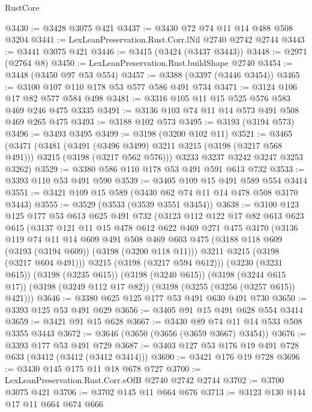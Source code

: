 \begin{lexlean}{RustCore}
\begin{coremodule}
@3430 := @3428 @3075 @421
@3437 := @3430 @72 @74 @11 @14 @488 @508 @3204
@3441 := LexLeanPreservation.Rust.Corr.lNil @2740 @2742 @2744
@3443 := @3441 @3075 @421
@3446 := @3415 (@3424 (@3437 @3443))
@3448 := @2971 (@2764 @8)
@3450 := LexLeanPreservation.Rust.buildShape @2740
@3454 := @3448 (@3450 @97 @53 @554)
@3457 := @3388 (@3397 (@3446 @3454))
@3465 := @3100 @107 @110 @178 @53 @577 @586 @491 @734
@3471 := @3124 @106 @17 @82 @577 @584 @498
@3481 := @3316 @105 @11 @15 @525 @576 @583 @469 @246 @475 @3335
@3491 := @3136 @103 @74 @11 @14 @573 @491 @508 @469 @265 @475
@3493 := @3188 @102 @573
@3495 := @3193 (@3194 @573)
@3496 := @3493 @3495
@3499 := @3198 (@3200 @102 @11)
@3521 := @3465
    (@3471
      (@3481
        (@3491 (@3496 @3499) @3211 @3215 (@3198 (@3217 @568 @491)))
        @3215
        (@3198 (@3217 @562 @576)))
      @3233
      @3237
      @3242
      @3247
      @3253
      @3262)
@3529 := @3380 @586 @110 @178 @53 @491 @591 @613 @732
@3533 := @3393 @110 @53 @491 @590
@3539 := @3405 @109 @15 @491 @589 @554 @3414
@3551 := @3421 @109 @15 @589 (@3430 @62 @74 @11 @14 @478 @508 @3170 @3443)
@3555 := @3529 (@3533 (@3539 @3551 @3454))
@3638 := @3100
    @123
    @125
    @177
    @53
    @613
    @625
    @491
    @732
    (@3123
      @112
      @122
      @17
      @82
      @613
      @623
      @615
      (@3137
        @121
        @11
        @15
        @478
        @612
        @622
        @469
        @271
        @475
        @3170
        (@3136
          @119
          @74
          @11
          @14
          @609
          @491
          @508
          @469
          @603
          @475
          (@3188 @118 @609 (@3193 (@3194 @609)) (@3198 (@3200 @118 @11)))
          @3211
          @3215
          (@3198 (@3217 @604 @491)))
        @3215
        (@3198 (@3217 @594 @612)))
      (@3230 (@3231 @615))
      (@3198 (@3235 @615))
      (@3198 (@3240 @615))
      (@3198 (@3244 @615 @17))
      (@3198 (@3249 @112 @17 @82))
      (@3198 (@3255 (@3256 (@3257 @615)) @421)))
@3646 := @3380 @625 @125 @177 @53 @491 @630 @491 @730
@3650 := @3393 @125 @53 @491 @629
@3656 := @3405 @91 @15 @491 @628 @554 @3414
@3659 := @3421 @91 @15 @628
@3667 := @3430 @89 @74 @11 @14 @533 @508 @3355 @3443
@3672 := @3646 (@3650 (@3656 (@3659 @3667) @3454))
@3676 := @3393 @177 @53 @491 @729
@3687 := @3403 @127 @53 @176 @19 @491 @728 @633 (@3412 (@3412 (@3412 @3414)))
@3690 := @3421 @176 @19 @728
@3696 := @3430 @145 @175 @11 @18 @678 @727
@3700 := LexLeanPreservation.Rust.Corr.eOfB @2740 @2742 @2744
@3702 := @3700 @3075 @421
@3706 := @3702 @145 @11 @664 @676
@3713 := @3123 @130 @144 @17 @11 @664 @674 @666

\end{coremodule}
\end{lexlean}
